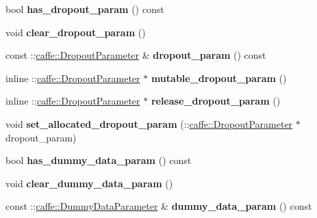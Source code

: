 \begin{DoxyCompactItemize}
bool {\bfseries has\+\_\+dropout\+\_\+param} () const
\item 
\mbox{\label{classcaffe_1_1_v1_layer_parameter_a57b17face87cb87b1d687d908ca0bdb4}} 
void {\bfseries clear\+\_\+dropout\+\_\+param} ()
\item 
\mbox{\label{classcaffe_1_1_v1_layer_parameter_acd26ad5fb4c474133463e30e567bbe09}} 
const \+::\mbox{\hyperlink{classcaffe_1_1_dropout_parameter}{caffe\+::\+Dropout\+Parameter}} \& {\bfseries dropout\+\_\+param} () const
\item 
\mbox{\label{classcaffe_1_1_v1_layer_parameter_a2eb2c4f9fd8733ca8d888601aa2749f6}} 
inline \+::\mbox{\hyperlink{classcaffe_1_1_dropout_parameter}{caffe\+::\+Dropout\+Parameter}} $\ast$ {\bfseries mutable\+\_\+dropout\+\_\+param} ()
\item 
\mbox{\label{classcaffe_1_1_v1_layer_parameter_a468cb67b20813067dc09b4c249a02f33}} 
inline \+::\mbox{\hyperlink{classcaffe_1_1_dropout_parameter}{caffe\+::\+Dropout\+Parameter}} $\ast$ {\bfseries release\+\_\+dropout\+\_\+param} ()
\item 
\mbox{\label{classcaffe_1_1_v1_layer_parameter_ade3a2f1e968e0e0e63e015d8c31c00da}} 
void {\bfseries set\+\_\+allocated\+\_\+dropout\+\_\+param} (\+::\mbox{\hyperlink{classcaffe_1_1_dropout_parameter}{caffe\+::\+Dropout\+Parameter}} $\ast$dropout\+\_\+param)
\item 
\mbox{\label{classcaffe_1_1_v1_layer_parameter_a2fbbd2444e33636c714e582903262958}} 
bool {\bfseries has\+\_\+dummy\+\_\+data\+\_\+param} () const
\item 
\mbox{\label{classcaffe_1_1_v1_layer_parameter_ac0fdf838fe4bb3e21e07ada3df5017b8}} 
void {\bfseries clear\+\_\+dummy\+\_\+data\+\_\+param} ()
\item 
\mbox{\label{classcaffe_1_1_v1_layer_parameter_aad3bcd937910c5d7d4da5323aab2188e}} 
const \+::\mbox{\hyperlink{classcaffe_1_1_dummy_data_parameter}{caffe\+::\+Dummy\+Data\+Parameter}} \& {\bfseries dummy\+\_\+data\+\_\+param} () const

\end{DoxyCompactItemize}

